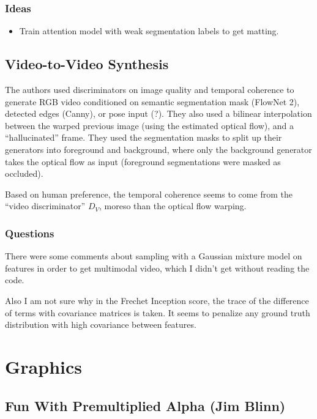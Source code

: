 \documentclass[a4paper, 12pt]{article}
\begin{document}
\subsubsection{Ideas}

\begin{itemize}
        \item Train attention model with weak segmentation labels to get
                matting.
\end{itemize}


\subsection{Video-to-Video Synthesis~\cite{wang2018vid2vid}}

The authors used discriminators on image quality and temporal coherence to
generate RGB video conditioned on semantic segmentation mask (FlowNet 2),
detected edges (Canny), or pose input (?). They also used a bilinear
interpolation between the warped previous image (using the estimated optical
flow), and a ``hallucinated'' frame. They used the segmentation masks to split
up their generators into foreground and background, where only the background
generator takes the optical flow as input (foreground segmentations were masked
as occluded).

Based on human preference, the temporal coherence seems to come from the
``video discriminator'' $D_V$, moreso than the optical flow warping.


\subsubsection{Questions}

There were some comments about sampling with a Gaussian mixture model on
features in order to get multimodal video, which I didn't get without reading
the code.

Also I am not sure why in the Frechet Inception score, the trace of the
difference of terms with covariance matrices is taken. It seems to penalize any
ground truth distribution with high covariance between features.


\section{Graphics}


\subsection{Fun With Premultiplied Alpha (Jim Blinn)}
\end{document}
